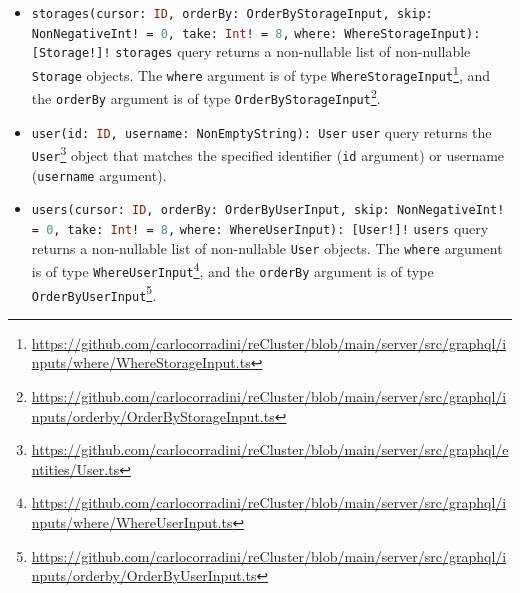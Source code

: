 \begin{itemize}
  \item \lstinline[language=graphql, morekeywords={[2]{Storage, OrderByStorageInput, NonNegativeInt, WhereStorageInput}},
    morekeywords={[4]{cursor, orderBy, skip, take, where}}, morekeywords={[5]{storages}}]{storages(cursor: ID, orderBy: OrderByStorageInput, skip: NonNegativeInt! = 0, take: Int! = 8,}
    \newline
    \hphantom{---------------}\lstinline[language=graphql, morekeywords={[2]{Storage, OrderByStorageInput, NonNegativeInt, WhereStorageInput}},
    morekeywords={[4]{cursor, orderBy, skip, take, where}}, morekeywords={[5]{storages}}]{where: WhereStorageInput): [Storage!]!}
    \newline
    \texttt{storages} query returns a non-nullable list of non-nullable \texttt{Storage}
    objects.
    \newline
    The \texttt{where} argument is of type \texttt{WhereStorageInput}\footnote{\url{https://github.com/carlocorradini/reCluster/blob/main/server/src/graphql/inputs/where/WhereStorageInput.ts}},
    and the \texttt{orderBy} argument is of type \texttt{OrderByStorageInput}\footnote{\url{https://github.com/carlocorradini/reCluster/blob/main/server/src/graphql/inputs/orderby/OrderByStorageInput.ts}}.

  \item \lstinline[language=graphql, morekeywords={[2]{User, NonEmptyString}}, morekeywords={[4]{id, username}},
    morekeywords={[5]{user}}]{user(id: ID, username: NonEmptyString): User}
    \newline
    \texttt{user} query returns the \texttt{User}\footnote{\url{https://github.com/carlocorradini/reCluster/blob/main/server/src/graphql/entities/User.ts}}
    object that matches the specified identifier (\texttt{id} argument) or username
    (\texttt{username} argument).

  \item \lstinline[language=graphql, morekeywords={[2]{User, OrderByUserInput, NonNegativeInt, WhereUserInput}},
    morekeywords={[4]{cursor, orderBy, skip, take, where}}, morekeywords={[5]{users}}]{users(cursor: ID, orderBy: OrderByUserInput, skip: NonNegativeInt! = 0, take: Int! = 8,}
    \newline
    \hphantom{-----------}\lstinline[language=graphql, morekeywords={[2]{User, OrderByUserInput, NonNegativeInt, WhereUserInput}},
    morekeywords={[4]{cursor, orderBy, skip, take, where}}, morekeywords={[5]{users}}]{where: WhereUserInput): [User!]!}
    \newline
    \texttt{users} query returns a non-nullable list of non-nullable \texttt{User}
    objects.
    \newline
    The \texttt{where} argument is of type \texttt{WhereUserInput}\footnote{\url{https://github.com/carlocorradini/reCluster/blob/main/server/src/graphql/inputs/where/WhereUserInput.ts}},
    and the \texttt{orderBy} argument is of type \texttt{OrderByUserInput}\footnote{\url{https://github.com/carlocorradini/reCluster/blob/main/server/src/graphql/inputs/orderby/OrderByUserInput.ts}}.
\end{itemize}


